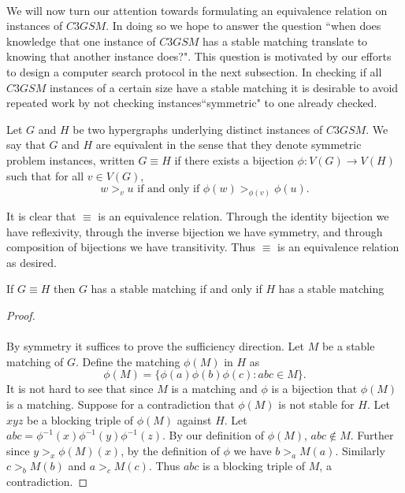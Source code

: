 \paragraph{}
We will now turn our attention towards formulating an equivalence relation on instances of $C3GSM$. In doing so we hope to answer the question ``when does knowledge that one instance of $C3GSM$ has a stable matching translate to knowing that another instance does?". This question is motivated by our efforts to design a computer search protocol in the next subsection. In checking if all $C3GSM$ instances of a certain size have a stable matching it is desirable to avoid repeated work by not checking instances``symmetric" to one already checked.
\begin{definition}
Let $G$ and $H$ be two hypergraphs underlying distinct instances of $C3GSM$. We say that $G$ and $H$ are equivalent in the sense that they denote symmetric problem instances, written $G \equiv H$ if there exists a bijection $\phi: V(G) \rightarrow V(H)$ such that for all $v \in V(G)$,
 \begin{equation}\label{cond:order}
 w >_v u \text{ if and only if } \phi(w) >_{\phi(v)} \phi(u).
 \end{equation}
 \end{definition}
\begin{note}
It is clear that $\equiv$ is an equivalence relation. Through the identity bijection we have reflexivity, through the inverse bijection we have symmetry, and through composition of bijections we have transitivity. Thus $\equiv$ is an equivalence relation as desired.
\end{note}
 \begin{lemma}
 If $G \equiv H$ then $G$ has a stable matching if and only if $H$ has a stable matching
 \end{lemma}
 \begin{proof}
 \paragraph{}
 By symmetry it suffices to prove the sufficiency direction. Let $M$ be a stable matching of $G$. Define the matching $\phi(M)$ in $H$ as
 $$\phi(M) = \{ \phi(a)\phi(b)\phi(c): abc \in M \}.$$
 It is not hard to see that since $M$ is a matching and $\phi$ is a bijection that $\phi(M)$ is a matching. Suppose for a contradiction that $\phi(M)$ is not stable for $H$. Let $xyz$ be a blocking triple of $\phi(M)$ against $H$. Let $abc = \phi^{-1}(x)\phi^{-1}(y)\phi^{-1}(z)$. By our definition of $\phi(M)$, $abc \not\in M$. Further since $y >_x \phi(M)(x)$, by the definition of $\phi$ we have $b >_a M(a)$. Similarly $c>_b M(b)$ and $a>_c M(c)$. Thus $abc$ is a blocking triple of $M$, a contradiction.
 \end{proof}
